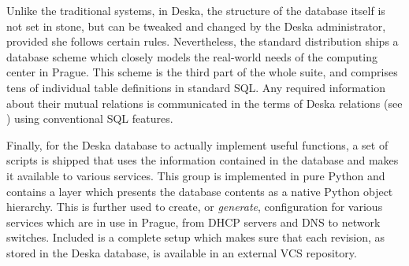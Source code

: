 \documentclass[deska]{subfiles}
\begin{document}
Unlike the traditional systems, in Deska, the structure of the database itself is not set in stone, but can be tweaked
and changed by the Deska administrator, provided she follows certain rules.  Nevertheless, the standard distribution
ships a database scheme which closely models the real-world needs of the computing center in Prague.  This scheme is the
third part of the whole suite, and comprises tens of individual table definitions in standard SQL.  Any required
information about their mutual relations is communicated in the terms of Deska relations (see
) using conventional SQL features.

Finally, for the Deska database to actually implement useful functions, a set of scripts is shipped that uses the
information contained in the database and makes it available to various services.  This group is implemented in pure
Python and contains a layer which presents the database contents as a native Python object hierarchy.  This is further
used to create, or {\em generate}, configuration for various services which are in use in Prague, from DHCP servers and
DNS to network switches.  Included is a complete setup which makes sure that each revision, as stored in the Deska
database, is available in an external VCS repository.
\end{document}
